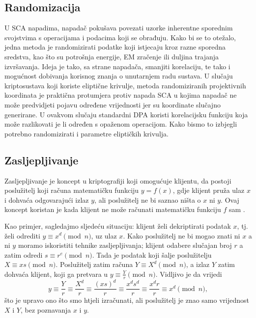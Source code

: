\documentclass[times, utf8, diplomski]{fer}
\begin{document}
\subsection{Randomizacija}

U SCA napadima, napadač pokušava povezati uzorke inherentne sporednim svojstvima s operacijama i podacima koji se obrađuju. Kako bi se to otežalo, jedna metoda je randomizirati podatke koji istjecaju kroz razne sporedna sredstva, kao što su potrošnja energije, EM zračenje ili duljina trajanja izvršavanja. Ideja je tako, sa strane napadača, smanjiti korelaciju, te tako i mogućnost dobivanja korisnog znanja o unutarnjem radu sustava.
U slučaju kriptosustava koji koriste eliptične krivulje, metoda randomiziranih projektivnih koordinata je praktična protumjera protiv napada SCA u kojima napadač ne može predvidjeti pojavu određene vrijednosti jer su koordinate slučajno generirane. U ovakvom slučaju standardni DPA koristi korelacijsku funkciju koja može razlikovati je li određen s opaženom operacijom. Kako bismo to izbjegli potrebno randomizirati i parametre eliptičkih krivulja.

\subsection{Zasljepljivanje}

Zasljepljivanje je koncept u kriptografiji koji omogućuje klijentu, da postoji poslužitelj koji računa matematičku funkciju \(y = f(x)\), gdje klijent pruža ulaz \(x\) i dohvaća odgovarajući izlaz \(y\), ali poslužitelj ne bi saznao ništa o \(x\) ni \(y\). Ovaj koncept koristan je kada klijent ne može računati matematičku funkciju \(f\) sam \citep{Bleumer2011}.

Kao primjer, sagledajmo sljedeću situaciju: klijent želi dekriptirati podatak \(x\), tj. želi odrediti \(y \equiv x^d \pmod{n}\), uz ulaz \(x\). Kako poslužitelj ne bi mogao znati ni \(x\) a ni \(y\) moramo iskoristiti tehnike zasljepljivanja; klijent odabere slučajan broj \(r\) a zatim odredi \(s \equiv r^e \pmod{n} \). Tada je podatak koji šalje poslužitelju \( X \equiv xs \pmod{n}\). Poslužitelj zatim računa \(Y \equiv X^d \pmod{n}\), a izlaz \(Y\) zatim dohvaća klijent, koji ga pretvara u \(y \equiv \frac{Y}{r} \pmod{n}\). Vidljivo je da vrijedi
\begin{equation}
    y \equiv
    \frac{Y}{r} \equiv
    \frac{X^d}{r} \equiv
    \frac{(xs)^d}{r} \equiv
    \frac{x^d s^d}{r} \equiv
    \frac{x^d r}{r} \equiv
    x^d \pmod{n},
\end{equation}
što je upravo ono što smo htjeli izračunati, ali poslužitelj je znao samo vrijednost \(X\) i \(Y\), bez poznavanja \(x\) i \(y\).
\end{document}
